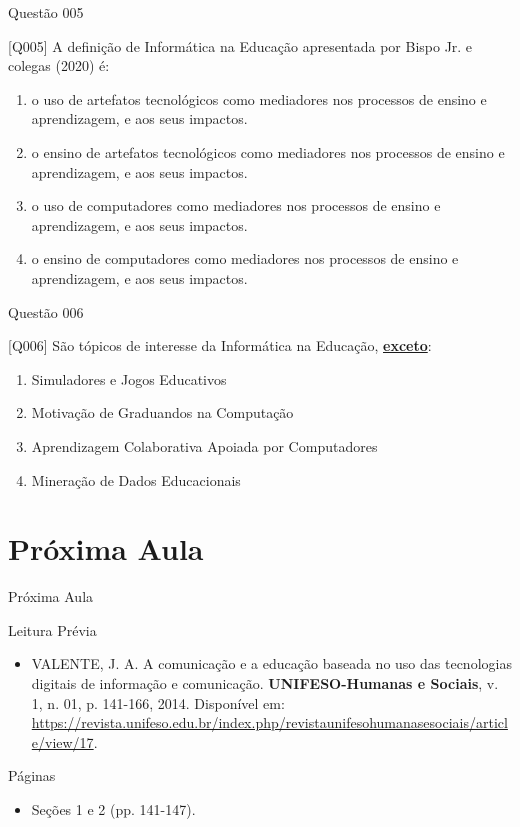 \documentclass[xcolor=dvipsnames,table]{beamer}
\begin{document}
        \begin{frame}{Questão 005}
		\begin{block}{[Q005]}
			A definição de Informática na Educação apresentada por Bispo Jr. e colegas (2020) é:
		\end{block}
		\begin{enumerate}[label=(\Alph*)]
			\item o uso de artefatos tecnológicos como mediadores nos processos de ensino e aprendizagem, e aos seus impactos.
			\item o ensino de artefatos tecnológicos como mediadores nos processos de ensino e aprendizagem, e aos seus impactos.
			\item o uso de computadores como mediadores nos processos de ensino e aprendizagem, e aos seus impactos.
			\item o ensino de computadores como mediadores nos processos de ensino e aprendizagem, e aos seus impactos.
		\end{enumerate}
	\end{frame}

        \begin{frame}{Questão 006}
		\begin{block}{[Q006]}
			São tópicos de interesse da Informática na Educação, \underline{\bf exceto}:
		\end{block}
		\begin{enumerate}[label=(\Alph*)]
			\item Simuladores e Jogos Educativos
                \item Motivação de Graduandos na Computação
                \item  Aprendizagem  Colaborativa  Apoiada  por Computadores
                \item Mineração de Dados Educacionais
		\end{enumerate}
	\end{frame}

\section{Próxima Aula}
\begin{frame}{Próxima Aula}
    \begin{block}{Leitura Prévia}
        \begin{itemize}
            \item VALENTE, J. A. A comunicação e a educação baseada no uso das tecnologias digitais de informação e comunicação. {\bf UNIFESO-Humanas e Sociais}, v. 1, n. 01, p. 141-166, 2014. Disponível em: \url{https://revista.unifeso.edu.br/index.php/revistaunifesohumanasesociais/article/view/17}.  
        \end{itemize}
    \end{block}
    \begin{block}{Páginas}
        \begin{itemize}
        \item Seções 1 e 2 (pp. 141-147). 
        \end{itemize}
    \end{block}
\end{frame}
	
	\begin{frame}
		\titlepage
	\end{frame}
	
\end{document}
